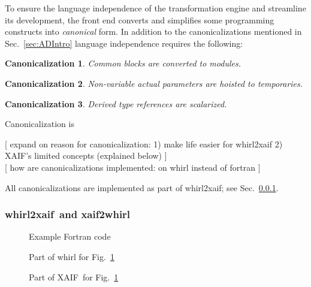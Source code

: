 \documentclass[11pt]{article}
\newcommand{\xaif}{XAIF}
\newcommand{\whirlToxaif}{whirl2xaif}
\newcommand{\xaifTowhirl}{xaif2whirl}
\newcommand{\refsec}[1]{{Sec.~\ref{#1}}}
\newcommand{\reffig}[1]{{Fig.~\ref{#1}}}
\newtheorem{Can}{Canonicalization}
\begin{document}
To ensure the language independence of the transformation engine and
streamline its development, the front end converts and simplifies some
programming constructs into \emph{canonical} form.  In addition to the
canonicalizations mentioned in \refsec{sec:ADIntro} language
independence requires the following:

\begin{Can}\label{can:comBlock}
Common blocks are converted to modules.
\end{Can}
\begin{Can}\label{can:param}
Non-variable actual parameters are hoisted to temporaries.
\end{Can}
\begin{Can}\label{can:scalar}
Derived type references are scalarized.
\end{Can}	


{\color{red}
Canonicalization is 

[ expand on reason for canonicalization: 
1) make life easier for whirl2xaif
2) XAIF's limited concepts (explained below) 
] \\

[ how are canonicalizations implemented: on whirl instead of fortran ] \\

}

All canonicalizations are implemented as part of \whirlToxaif; see 
\refsec{sssec:wtxxtw}.

\subsubsection{\whirlToxaif\ and \xaifTowhirl}\label{sssec:wtxxtw}

\begin{figure}
\scriptsize
{}
\caption{Example Fortran code}\label{fig:exampleFortranCode}
\end{figure}

\begin{figure}
\scriptsize
{}
\caption{Part of whirl for \reffig{fig:exampleFortranCode}}\label{fig:exampleWhirlCode}
\end{figure}

\begin{figure}
\scriptsize
{}
\caption{Part of \xaif\ for \reffig{fig:exampleFortranCode}}\label{fig:exampleXaifCode}
\end{figure}
\end{document}
